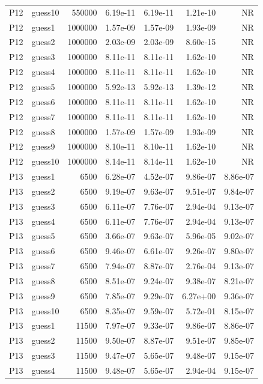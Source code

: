 {\begin{longtable}{llrrrrr}
P12 & guess10 & 550000 & 6.19e-11 & 6.19e-11 & 1.21e-10 & NR \\
P12 & guess1 & 1000000 & 1.57e-09 & 1.57e-09 & 1.93e-09 & NR \\
P12 & guess2 & 1000000 & 2.03e-09 & 2.03e-09 & 8.60e-15 & NR \\
P12 & guess3 & 1000000 & 8.11e-11 & 8.11e-11 & 1.62e-10 & NR \\
P12 & guess4 & 1000000 & 8.11e-11 & 8.11e-11 & 1.62e-10 & NR \\
P12 & guess5 & 1000000 & 5.92e-13 & 5.92e-13 & 1.39e-12 & NR \\
P12 & guess6 & 1000000 & 8.11e-11 & 8.11e-11 & 1.62e-10 & NR \\
P12 & guess7 & 1000000 & 8.11e-11 & 8.11e-11 & 1.62e-10 & NR \\
P12 & guess8 & 1000000 & 1.57e-09 & 1.57e-09 & 1.93e-09 & NR \\
P12 & guess9 & 1000000 & 8.10e-11 & 8.10e-11 & 1.62e-10 & NR \\
P12 & guess10 & 1000000 & 8.14e-11 & 8.14e-11 & 1.62e-10 & NR \\
P13 & guess1 & 6500 & 6.28e-07 & 4.52e-07 & 9.86e-07 & 8.86e-07 \\
P13 & guess2 & 6500 & 9.19e-07 & 9.63e-07 & 9.51e-07 & 9.84e-07 \\
P13 & guess3 & 6500 & 6.11e-07 & 7.76e-07 & 2.94e-04 & 9.13e-07 \\
P13 & guess4 & 6500 & 6.11e-07 & 7.76e-07 & 2.94e-04 & 9.13e-07 \\
P13 & guess5 & 6500 & 3.66e-07 & 9.63e-07 & 5.96e-05 & 9.02e-07 \\
P13 & guess6 & 6500 & 9.46e-07 & 6.61e-07 & 9.26e-07 & 9.80e-07 \\
P13 & guess7 & 6500 & 7.94e-07 & 8.87e-07 & 2.76e-04 & 9.13e-07 \\
P13 & guess8 & 6500 & 8.51e-07 & 9.24e-07 & 9.38e-07 & 8.21e-07 \\
P13 & guess9 & 6500 & 7.85e-07 & 9.29e-07 & 6.27e+00 & 9.36e-07 \\
P13 & guess10 & 6500 & 8.35e-07 & 9.59e-07 & 5.72e-01 & 8.15e-07 \\
P13 & guess1 & 11500 & 7.97e-07 & 9.33e-07 & 9.86e-07 & 8.86e-07 \\
P13 & guess2 & 11500 & 9.50e-07 & 8.87e-07 & 9.51e-07 & 9.85e-07 \\
P13 & guess3 & 11500 & 9.47e-07 & 5.65e-07 & 9.48e-07 & 9.15e-07 \\
P13 & guess4 & 11500 & 9.48e-07 & 5.65e-07 & 2.94e-04 & 9.15e-07 \\

\end{longtable}}
